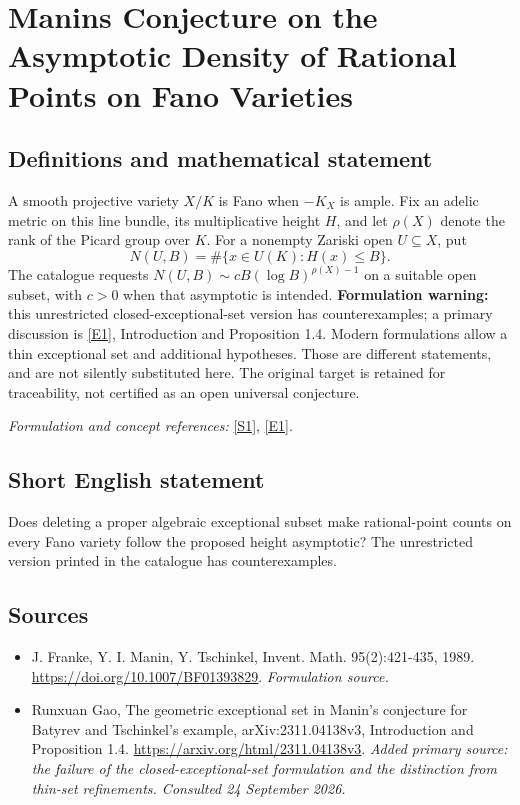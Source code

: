 \documentclass[11pt]{article}
\begin{document}
\section*{\texorpdfstring{Manins Conjecture on the Asymptotic Density of Rational Points on Fano Varieties}{Manins Conjecture on the Asymptotic Density of Rational Points on Fano Varieties}}\label{159}
\subsection{Definitions and mathematical statement}
A smooth projective variety $X/K$ is Fano when $-K_X$ is ample. Fix an adelic metric on this line bundle, its multiplicative height $H$, and let $\rho(X)$ denote the rank of the Picard group over $K$. For a nonempty Zariski open $U\subseteq X$, put
\[
 N(U,B)=\#\{x\in U(K):H(x)\le B\}.
\]
The catalogue requests $N(U,B)\sim cB(\log B)^{\rho(X)-1}$ on a suitable open subset, with $c>0$ when that asymptotic is intended. \textbf{Formulation warning:} this unrestricted closed-exceptional-set version has counterexamples; a primary discussion is \href{https://arxiv.org/html/2311.04138v3}{[E1]}, Introduction and Proposition 1.4. Modern formulations allow a thin exceptional set and additional hypotheses. Those are different statements, and are not silently substituted here. The original target is retained for traceability, not certified as an open universal conjecture.
\par\smallskip\textit{Formulation and concept references:} \href{https://doi.org/10.1007/BF01393829}{[S1]}, \href{https://arxiv.org/html/2311.04138v3}{[E1]}.

\subsection{Short English statement}
Does deleting a proper algebraic exceptional subset make rational-point counts on every Fano variety follow the proposed height asymptotic? The unrestricted version printed in the catalogue has counterexamples.
\subsection{Sources}
\begin{itemize}
\item[S1]J. Franke, Y. I. Manin, Y. Tschinkel, Invent. Math. 95(2):421-435, 1989.
\url{https://doi.org/10.1007/BF01393829}.
\textit{Formulation source.}
\item[E1]Runxuan Gao, The geometric exceptional set in Manin's conjecture for Batyrev and Tschinkel's example, arXiv:2311.04138v3, Introduction and Proposition 1.4.
\url{https://arxiv.org/html/2311.04138v3}.
\textit{Added primary source: the failure of the closed-exceptional-set formulation and the distinction from thin-set refinements. Consulted 24 September 2026.}
\end{itemize}
\end{document}
